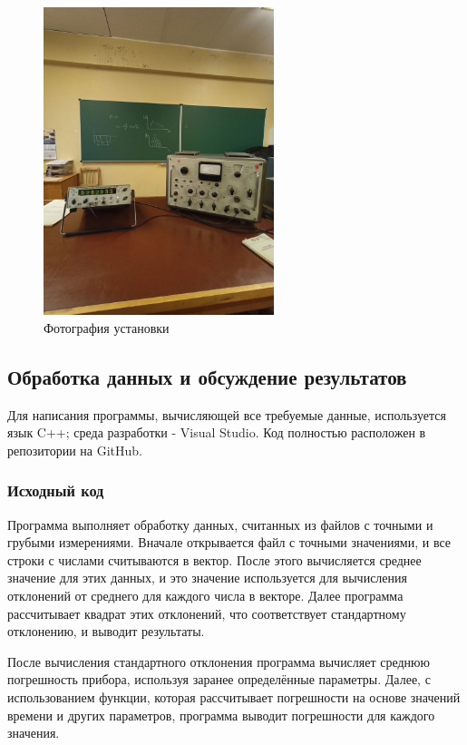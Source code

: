 \begin{figure}[H]
\centering
\includegraphics[width=0.6\textwidth]{Device.png}
\caption{Фотография установки}
\label{fig:device}
\end{figure}


\subsection{Обработка данных и обсуждение результатов}
Для написания программы, вычисляющей все требуемые данные, используется язык C++; среда разработки - Visual Studio.
Код полностью расположен в репозитории на GitHub.


\subsubsection{Исходный код} 

Программа выполняет обработку данных, считанных из файлов с точными и грубыми измерениями. Вначале открывается файл с точными значениями, и все строки с числами считываются в вектор. После этого вычисляется среднее значение для этих данных, и это значение используется для вычисления отклонений от среднего для каждого числа в векторе. Далее программа рассчитывает квадрат этих отклонений, что соответствует стандартному отклонению, и выводит результаты.

После вычисления стандартного отклонения программа вычисляет среднюю погрешность прибора, используя заранее определённые параметры. Далее, с использованием функции, которая рассчитывает погрешности на основе значений времени и других параметров, программа выводит погрешности для каждого значения.

